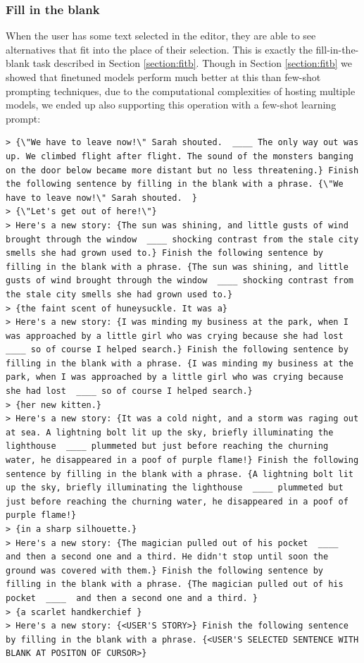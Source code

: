 \subsubsection{Fill in the blank}
When the user has some text selected in the editor, they are able to see alternatives that fit into the place of their selection.
This is exactly the fill-in-the-blank task described in Section \ref{section:fitb}.
Though in Section \ref{section:fitb} we showed that finetuned models perform much better at this than few-shot prompting techniques, due to the computational complexities of hosting multiple models, we ended up also supporting this operation with a few-shot learning prompt:

\begin{verbatim}
> {\"We have to leave now!\" Sarah shouted.  ____ The only way out was up. We climbed flight after flight. The sound of the monsters banging on the door below became more distant but no less threatening.} Finish the following sentence by filling in the blank with a phrase. {\"We have to leave now!\" Sarah shouted.  }
> {\"Let's get out of here!\"}
> Here's a new story: {The sun was shining, and little gusts of wind brought through the window  ____ shocking contrast from the stale city smells she had grown used to.} Finish the following sentence by filling in the blank with a phrase. {The sun was shining, and little gusts of wind brought through the window  ____ shocking contrast from the stale city smells she had grown used to.}
> {the faint scent of huneysuckle. It was a}
> Here's a new story: {I was minding my business at the park, when I was approached by a little girl who was crying because she had lost  ____ so of course I helped search.} Finish the following sentence by filling in the blank with a phrase. {I was minding my business at the park, when I was approached by a little girl who was crying because she had lost  ____ so of course I helped search.}
> {her new kitten.}
> Here's a new story: {It was a cold night, and a storm was raging out at sea. A lightning bolt lit up the sky, briefly illuminating the lighthouse  ____ plummeted but just before reaching the churning water, he disappeared in a poof of purple flame!} Finish the following sentence by filling in the blank with a phrase. {A lightning bolt lit up the sky, briefly illuminating the lighthouse  ____ plummeted but just before reaching the churning water, he disappeared in a poof of purple flame!}
> {in a sharp silhouette.}
> Here's a new story: {The magician pulled out of his pocket  ____  and then a second one and a third. He didn't stop until soon the ground was covered with them.} Finish the following sentence by filling in the blank with a phrase. {The magician pulled out of his pocket  ____  and then a second one and a third. }
> {a scarlet handkerchief }
> Here's a new story: {<USER'S STORY>} Finish the following sentence by filling in the blank with a phrase. {<USER'S SELECTED SENTENCE WITH BLANK AT POSITON OF CURSOR>}
\end{verbatim}

